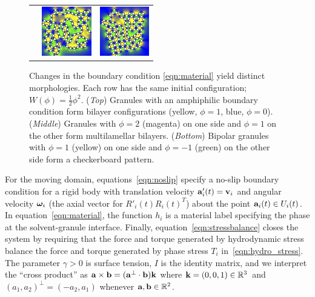 \begin{figure}
\begin{center}
\begin{tabular}{m{0.9in}m{0.9in}m{0.9in}}
      &\includegraphics[width=0.85in]{figures/SpecificAim1/N100A2.jpg}
      &\includegraphics[width=0.85in]{figures/SpecificAim1/N100A3.jpg} 
  \end{tabular}
  \end{center}
  \vspace{-20pt}
  \caption{\footnotesize \label{fig:self-assembly2} Changes in the
  boundary condition \eqref{eqn:material} yield distinct morphologies.
  Each row has the same initial configuration; $W(\phi) =
  \tfrac{1}{2}\phi^2$. (\emph{Top}) Granules with an amphiphilic
  boundary condition form bilayer configurations (yellow, $\phi = 1$,
  blue, $\phi = 0$). (\emph{Middle}) Granules with $\phi = 2$ (magenta)
  on one side and $\phi = 1$ on the other form multilamellar bilayers.
  (\emph{Bottom}) Bipolar granules with $\phi = 1$ (yellow) on one side
  and $\phi=-1$ (green) on the other side form a checkerboard pattern.}
\end{figure}

For the moving domain, equations~\eqref{eqn:noslip}
specify a no-slip boundary condition for a rigid body with translation
velocity $\aa'_i(t) = \vv_i$ and angular velocity $\oomega_i$ (the axial
vector for $R'_i(t)R_i(t)^T$) about the point $\aa_i(t) \in U_i(t)$. In
equation~\eqref{eqn:material}, the function $h_i$ is a material label
specifying the phase at the solvent-granule interface. Finally,
equation~\eqref{eqn:stressbalance} closes the system by requiring that
the force and torque generated by hydrodynamic stress balance
the force and torque 
generated by phase stress $T_i$ in~\eqref{eqn:hydro_stress}. The
parameter $\gamma > 0$ is surface tension, $I$ is the identity matrix,
and we interpret the ``cross product'' as $\aa \times \bb = (\aa^{\perp} \cdot
\bb) \kk$ where $\kk = (0,0,1) \in \RR^3$ and $(a_1,a_2)^{\perp} =
(-a_2,a_1)$ whenever $\aa, \bb \in \mathbb{R}^2$.

